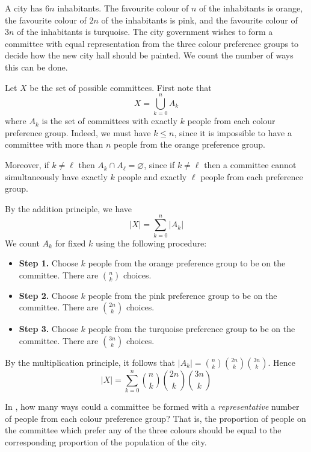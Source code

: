 \begin{example}
\label{exCityColour}
A city has $6n$ inhabitants. The favourite colour of $n$ of the inhabitants is orange, the favourite colour of $2n$ of the inhabitants is pink, and the favourite colour of $3n$ of the inhabitants is turquoise. The city government wishes to form a committee with equal representation from the three colour preference groups to decide how the new city hall should be painted. We count the number of ways this can be done.

Let $X$ be the set of possible committees. First note that
\[ X = \bigcup_{k=0}^n A_k \]
where $A_k$ is the set of committees with exactly $k$ people from each colour preference group. Indeed, we must have $k \le n$, since it is impossible to have a committee with more than $n$ people from the orange preference group.

Moreover, if $k \ne \ell$ then $A_k \cap A_{\ell} = \varnothing$, since if $k \ne \ell$ then a committee cannot simultaneously have exactly $k$ people and exactly $\ell$ people from each preference group.

By the addition principle, we have
\[ |X| = \sum_{k=0}^n |A_k| \]
We count $A_k$ for fixed $k$ using the following procedure:
\begin{itemize}
\item \textbf{Step 1.} Choose $k$ people from the orange preference group to be on the committee. There are $\binom{n}{k}$ choices.
\item \textbf{Step 2.} Choose $k$ people from the pink preference group to be on the committee. There are $\binom{2n}{k}$ choices.
\item \textbf{Step 3.} Choose $k$ people from the turquoise preference group to be on the committee. There are $\binom{3n}{k}$ choices.
\end{itemize}
By the multiplication principle, it follows that $|A_k| = \binom{n}{k} \binom{2n}{k} \binom{3n}{k}$. Hence
\[ |X| = \sum_{k=0}^n \binom{n}{k} \binom{2n}{k} \binom{3n}{k} \]
\end{example}

\begin{exercise}
\label{exCityColourModified}
In , how many ways could a committee be formed with a \textit{representative} number of people from each colour preference group? That is, the proportion of people on the committee which prefer any of the three colours should be equal to the corresponding proportion of the population of the city.
\end{exercise}

